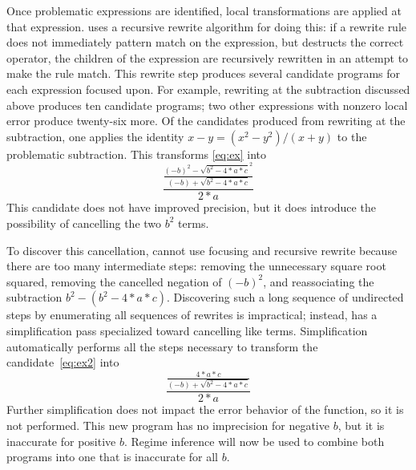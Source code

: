 \documentclass[paper.tex]{subfiles}
\begin{document}
Once problematic expressions are identified,
  local transformations are applied at that expression.
\casio uses a recursive rewrite algorithm for doing this:
  if a rewrite rule does not immediately pattern match on the expression,
  but destructs the correct operator,
  the children of the expression are recursively rewritten
  in an attempt to make the rule match.
This rewrite step produces several candidate programs
  for each expression focused upon.
For example, rewriting at the subtraction discussed above
  produces ten candidate programs;
  two other expressions with nonzero local error produce twenty-six more.
Of the candidates produced from rewriting at the subtraction,
  one applies the identity
  $x - y = (x^2 - y^2) / (x + y)$ to the problematic subtraction.
This transforms \eqref{eq:ex} into
\begin{equation} \label{eq:ex2}
  \frac{\frac{(-b)^2 - \sqrt{b^2 - 4*a*c}^2}
             {(-b) + \sqrt{b^2 - 4*a*c}}}
       {2 * a}
\end{equation}
This candidate does not have improved precision,
  but it does introduce the possibility
  of cancelling the two $b^2$ terms.

To discover this cancellation,
  \casio cannot use focusing and recursive rewrite
  because there are too many intermediate steps:
  removing the unnecessary square root squared,
  removing the cancelled negation of $(-b)^2$,
  and reassociating the subtraction $b^2 - (b^2 - 4*a*c)$.
Discovering such a long sequence of undirected steps
  by enumerating all sequences of rewrites
  is impractical;
  instead, \casio has a simplification pass
  specialized toward cancelling like terms.
Simplification automatically performs all the steps necessary
  to transform the candidate~\eqref{eq:ex2} into
\begin{equation} \label{eq:ex3}
  \frac{\frac{4*a*c}
             {(-b) + \sqrt{b^2 - 4*a*c}}}
       {2*a}
\end{equation}
Further simplification does not impact the error behavior of the function,
  so it is not performed.
This new program has no imprecision for negative $b$,
  but it is inaccurate for positive $b$.
Regime inference will now be used to combine both programs
  into one that is inaccurate for all $b$.
\end{document}
